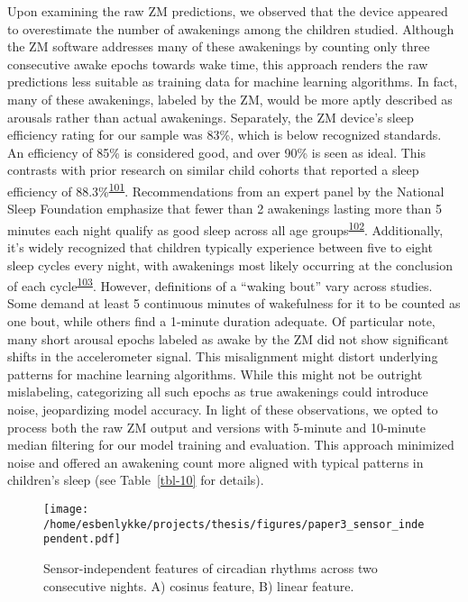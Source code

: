 \documentclass[
  9pt,
]{scrbook}
\begin{document}
Upon examining the raw ZM predictions, we observed that the device
appeared to overestimate the number of awakenings among the children
studied. Although the ZM software addresses many of these awakenings by
counting only three consecutive awake epochs towards wake time, this
approach renders the raw predictions less suitable as training data for
machine learning algorithms. In fact, many of these awakenings, labeled
by the ZM, would be more aptly described as arousals rather than actual
awakenings. Separately, the ZM device's sleep efficiency rating for our
sample was 83\%, which is below recognized standards. An efficiency of
85\% is considered good, and over 90\% is seen as ideal. This contrasts
with prior research on similar child cohorts that reported a sleep
efficiency of
88.3\%\textsuperscript{\protect\hyperlink{ref-galland_2018}{101}}.
Recommendations from an expert panel by the National Sleep Foundation
emphasize that fewer than 2 awakenings lasting more than 5 minutes each
night qualify as good sleep across all age
groups\textsuperscript{\protect\hyperlink{ref-ohayon_2017}{102}}.
Additionally, it's widely recognized that children typically experience
between five to eight sleep cycles every night, with awakenings most
likely occurring at the conclusion of each
cycle\textsuperscript{\protect\hyperlink{ref-galland_normal_2012}{103}}.
However, definitions of a ``waking bout'' vary across studies. Some
demand at least 5 continuous minutes of wakefulness for it to be counted
as one bout, while others find a 1-minute duration adequate. Of
particular note, many short arousal epochs labeled as awake by the ZM
did not show significant shifts in the accelerometer signal. This
misalignment might distort underlying patterns for machine learning
algorithms. While this might not be outright mislabeling, categorizing
all such epochs as true awakenings could introduce noise, jeopardizing
model accuracy. In light of these observations, we opted to process both
the raw ZM output and versions with 5-minute and 10-minute median
filtering for our model training and evaluation. This approach minimized
noise and offered an awakening count more aligned with typical patterns
in children's sleep (see Table~\ref{tbl-10} for details).

\begin{figure}

{\centering \texttt{[image: /home/esbenlykke/projects/thesis/figures/paper3\_sensor\_independent.pdf]}

}

\caption{\label{fig-paper3_sensor_independent}Sensor-independent
features of circadian rhythms across two consecutive nights. A) cosinus
feature, B) linear feature.}

\end{figure}
\end{document}
